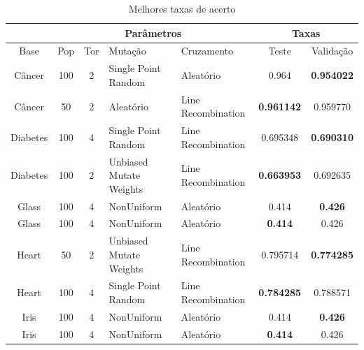\documentclass[12pt]{article}
\begin{document}
\begin{table}[h]
\center
\begin{tabular}{c|c|c|p{3cm}|p{3cm}|c|c|}
\cline{2-7}
&  \multicolumn{4}{|c|}{Parâmetros}  & \multicolumn{2}{|c|}{Taxas} \\ \hline
\multicolumn{1}{|c|}{Base} & Pop & Tor & Mutação & Cruzamento & Teste & Validação \\ \hline
\multicolumn{1}{|c|}{Câncer} & 100 & 2 & Single Point Random & Aleatório & 0.964 & \textbf{0.954022 }\\ \hline
\multicolumn{1}{|c|}{Câncer} & 50 & 2 & Aleatório & Line Recombination & \textbf{0.961142 }& 0.959770 \\ \hline
\multicolumn{1}{|c|}{Diabetes} & 100 & 4 & Single Point Random & Line Recombination & 0.695348 & \textbf{0.690310}\\ \hline
\multicolumn{1}{|c|}{Diabetes} & 100 & 2 & Unbiased Mutate Weights & Line Recombination & \textbf{0.663953} & 0.692635 \\ \hline
\multicolumn{1}{|c|}{Glass} & 100 & 4 & NonUniform & Aleatório & 0.414 & \textbf{0.426 }\\ \hline 
\multicolumn{1}{|c|}{Glass} & 100 & 4 & NonUniform & Aleatório & \textbf{0.414} & 0.426 \\ \hline 
\multicolumn{1}{|c|}{Heart} & 50 & 2 & Unbiased Mutate Weights & Line Recombination & 0.795714 & \textbf{0.774285} \\ \hline
\multicolumn{1}{|c|}{Heart} & 100 & 4 & Single Point Random & Line Recombination & \textbf{0.784285} & 0.788571 \\ \hline
\multicolumn{1}{|c|}{Iris} & 100 & 4 & NonUniform & Aleatório & 0.414 & \textbf{0.426 }\\ \hline 
\multicolumn{1}{|c|}{Iris} & 100 & 4 & NonUniform & Aleatório & \textbf{0.414} & 0.426 \\ \hline
\end{tabular}
\caption{Melhores taxas de acerto}
\label{tab:hitbest}
\end{table}
\end{document}

